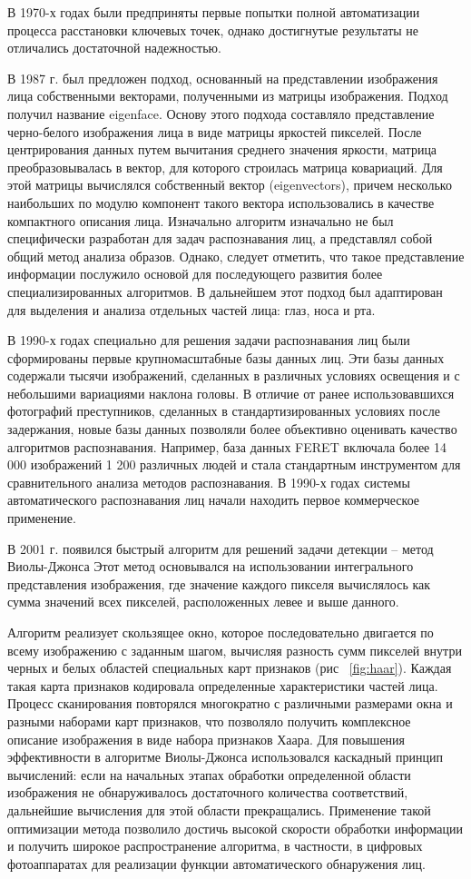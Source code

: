 В 1970-х годах были предприняты первые попытки полной автоматизации процесса расстановки ключевых точек, однако достигнутые результаты не отличались достаточной надежностью.

В 1987 г. был предложен подход, основанный на представлении изображения лица собственными векторами, полученными из матрицы изображения. Подход получил название eigenface. Основу этого подхода составляло представление черно-белого изображения лица в виде матрицы яркостей пикселей. После центрирования данных путем вычитания среднего значения яркости, матрица преобразовывалась в вектор, для которого строилась матрица ковариаций. Для этой матрицы вычислялся собственный вектор (eigenvectors), причем несколько наибольших по модулю компонент такого вектора использовались в качестве компактного описания лица. Изначально алгоритм изначально не был специфически разработан для задач распознавания лиц, а представлял собой общий метод анализа образов. Однако, следует отметить, что такое представление информации послужило основой для последующего развития более специализированных алгоритмов. В дальнейшем этот подход был адаптирован для выделения и анализа отдельных частей лица: глаз, носа и рта.

В 1990-х годах специально для решения задачи распознавания лиц были сформированы первые крупномасштабные базы данных лиц. Эти базы данных содержали тысячи изображений, сделанных в различных условиях освещения и с небольшими вариациями наклона головы. В отличие от ранее использовавшихся фотографий преступников, сделанных в стандартизированных условиях после задержания, новые базы данных позволяли более объективно оценивать качество алгоритмов распознавания. Например, база данных FERET включала более 14 000 изображений 1 200 различных людей и стала стандартным инструментом для сравнительного анализа методов распознавания. В 1990-х годах системы автоматического распознавания лиц начали находить первое коммерческое применение.

В 2001 г. появился быстрый алгоритм для решений задачи детекции –  метод Виолы-Джонса  Этот метод основывался на использовании интегрального представления изображения, где значение каждого пикселя вычислялось как сумма значений всех пикселей, расположенных левее и выше данного.

Алгоритм реализует скользящее окно, которое последовательно двигается по всему изображению с заданным шагом, вычисляя разность сумм пикселей внутри черных и белых областей специальных карт признаков (рис ~\ref{fig:haar}). Каждая такая карта признаков кодировала определенные характеристики частей лица. Процесс сканирования повторялся многократно с различными размерами окна и разными наборами карт признаков, что позволяло получить комплексное описание изображения в виде набора признаков Хаара. Для повышения эффективности в алгоритме Виолы-Джонса использовался каскадный принцип вычислений: если на начальных этапах обработки определенной области изображения не обнаруживалось достаточного количества соответствий, дальнейшие вычисления для этой области прекращались. Применение такой оптимизации метода позволило достичь высокой скорости обработки информации и получить широкое распространение алгоритма, в частности, в цифровых фотоаппаратах для реализации функции автоматического обнаружения лиц.


